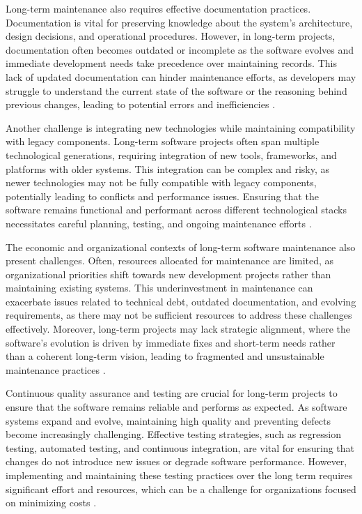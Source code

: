 \begin{refsection}
Long-term maintenance also requires effective documentation practices. Documentation is vital for preserving knowledge about the system’s architecture, design decisions, and operational procedures. However, in long-term projects, documentation often becomes outdated or incomplete as the software evolves and immediate development needs take precedence over maintaining records. This lack of updated documentation can hinder maintenance efforts, as developers may struggle to understand the current state of the software or the reasoning behind previous changes, leading to potential errors and inefficiencies \cite[pp.~89-91]{pigoski2008practical}.

Another challenge is integrating new technologies while maintaining compatibility with legacy components. Long-term software projects often span multiple technological generations, requiring integration of new tools, frameworks, and platforms with older systems. This integration can be complex and risky, as newer technologies may not be fully compatible with legacy components, potentially leading to conflicts and performance issues. Ensuring that the software remains functional and performant across different technological stacks necessitates careful planning, testing, and ongoing maintenance efforts \cite[pp.~654-656]{pressman2019software}.

The economic and organizational contexts of long-term software maintenance also present challenges. Often, resources allocated for maintenance are limited, as organizational priorities shift towards new development projects rather than maintaining existing systems. This underinvestment in maintenance can exacerbate issues related to technical debt, outdated documentation, and evolving requirements, as there may not be sufficient resources to address these challenges effectively. Moreover, long-term projects may lack strategic alignment, where the software’s evolution is driven by immediate fixes and short-term needs rather than a coherent long-term vision, leading to fragmented and unsustainable maintenance practices \cite[pp.~132-134]{fairley2012managing}.

Continuous quality assurance and testing are crucial for long-term projects to ensure that the software remains reliable and performs as expected. As software systems expand and evolve, maintaining high quality and preventing defects become increasingly challenging. Effective testing strategies, such as regression testing, automated testing, and continuous integration, are vital for ensuring that changes do not introduce new issues or degrade software performance. However, implementing and maintaining these testing practices over the long term requires significant effort and resources, which can be a challenge for organizations focused on minimizing costs \cite[pp.~201-203]{fairley2012managing}.


\end{refsection}
